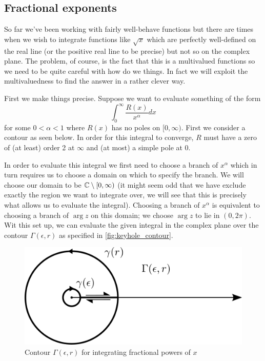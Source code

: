 \subsection{Fractional exponents}
So far we've been working with fairly well-behave functions but there are times when we wish to integrate functions like $\sqrt{x}$ which are perfectly well-defined on the real line (or the positive real line to be precise) but not so on the complex plane. The problem, of course, is the fact that this is a multivalued functions so we need to be quite careful with how do we things. In fact we will exploit the multivaluedness to find the answer in a rather clever way. 

First we make things precise. Suppose we want to evaluate something of the form
$$\int_0^\infty \frac{R(x)}{x^\alpha} dx$$
for some $0 < \alpha < 1$ where $R(x)$ has no poles on $[0, \infty)$. First we consider a contour as seen below. In order for this integral to converge, $R$ must have a zero of (at least) order 2 at $\infty$ and (at most) a simple pole at 0. 

In order to evaluate this integral we first need to choose a branch of $x^\alpha$ which in turn requires us to choose a domain on which to specify the branch. We will choose our domain to be $\mathbb{C} \setminus [0, \infty)$ (it might seem odd that we have exclude exactly the region we want to integrate over, we will see that this is precisely what allows us to evaluate the integral). Choosing a branch of $x^\alpha$ is equivalent to choosing a branch of $\arg z$ on this domain; we choose $\arg z$ to lie in $(0, 2\pi)$. 
Wit this set up, we can evaluate the given integral in the complex plane over the contour $\Gamma(\epsilon, r)$ as specified in \autoref{fig:keyhole_contour}.

\begin{figure}[ht]
    \centering
    \includegraphics[scale=1.1]{Images/keyhole_contour.png}
    \caption{Contour $\Gamma(\epsilon, r)$ for integrating fractional powers of $x$}
    \label{fig:keyhole_contour}
\end{figure}

